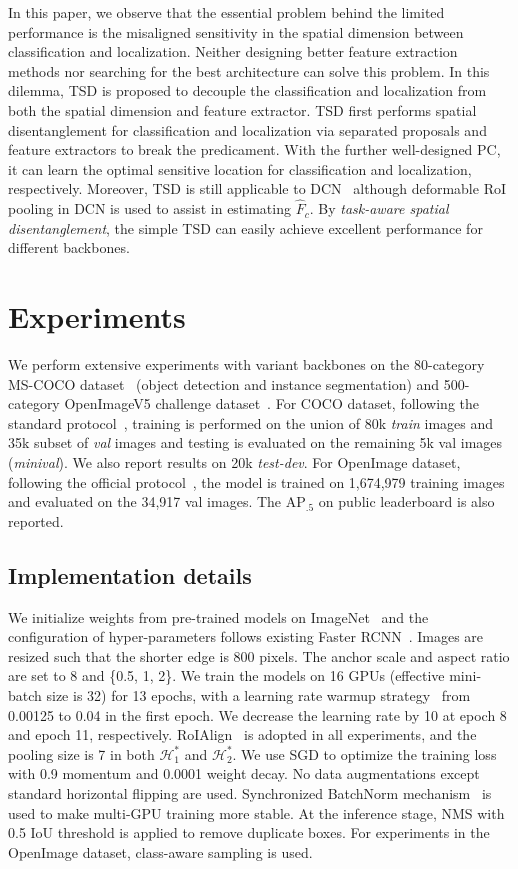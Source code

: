 \documentclass[10pt,twocolumn,letterpaper]{article}
\def \algfullname{\emph{task-aware spatial disentanglement}}
\def \algname{TSD}
\def \loss{PC}
\begin{document}
In this paper, we observe that the essential problem behind the limited performance is the misaligned sensitivity in the spatial dimension between classification and localization.
Neither designing better feature extraction methods nor searching for the best architecture can solve this problem. 
In this dilemma, \algname{} is proposed to decouple the classification and localization from both the spatial dimension and feature extractor.
\algname{} first performs spatial disentanglement for classification and localization via separated proposals and feature extractors to break the predicament. With the further well-designed \loss{}, it can learn the optimal sensitive location for classification and localization, respectively.
Moreover, \algname{} is still applicable to DCN~\cite{dai2017deformable} although deformable RoI pooling in DCN is used to assist in estimating $\hat{F}_c$.
By \algfullname{}, the simple \algname{} can easily achieve excellent performance for different backbones.


\section{Experiments}\label{exp}
We perform extensive experiments with variant backbones on the 80-category MS-COCO dataset~\cite{lin2014microsoft} (object detection and instance segmentation) and 500-category OpenImageV5 challenge dataset~\cite{OpenImages}. 
For COCO dataset, following the standard protocol~\cite{lu2019grid}, training is performed on the union of 80k \textit{train} images and 35k subset of \textit{val} images and testing is evaluated on the remaining 5k val images (\textit{minival}). We also report results on 20k \textit{test-dev}.
For OpenImage dataset, following the official protocol~\cite{OpenImages}, the model is trained on 1,674,979 training images and evaluated on the 34,917 val images.
The AP$_{.5}$ on public leaderboard is also reported.

\subsection{Implementation details}
We initialize weights from pre-trained models on ImageNet~\cite{russakovsky2015imagenet} and the configuration of hyper-parameters follows existing Faster RCNN~\cite{ren2015faster}.
Images are resized such that the shorter edge is 800 pixels.
The anchor scale and aspect ratio are set to 8 and \{0.5, 1, 2\}.
We train the models on 16 GPUs (effective mini-batch size is 32) for 13 epochs, with a learning rate warmup strategy~\cite{goyal2017accurate} from 0.00125 to 0.04 in the first epoch. We decrease the learning rate by 10 at epoch 8 and epoch 11, respectively.
RoIAlign~\cite{he2017mask} is adopted in all experiments, and the pooling size is 7 in both $\mathcal{H}^*_1$ and $\mathcal{H}^*_2$.
We use SGD to optimize the training loss with 0.9 momentum and 0.0001 weight decay. No data augmentations except standard horizontal flipping are used.
Synchronized BatchNorm mechanism~\cite{peng2018megdet,goyal2017accurate} is used to make multi-GPU training more stable.
At the inference stage, NMS with 0.5 IoU threshold is applied to remove duplicate boxes.
For experiments in the OpenImage dataset, class-aware sampling is used.
\end{document}
